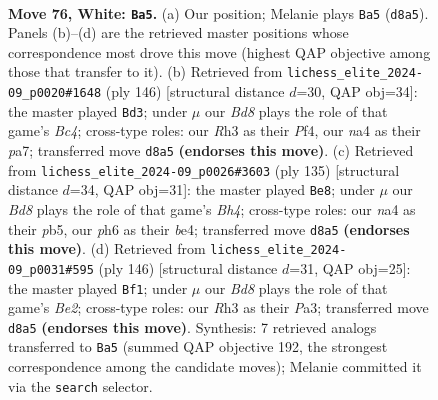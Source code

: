 \documentclass[11pt]{article}
\begin{document}
\begin{figure}[p]\centering
\begin{subfigure}{0.46\textwidth}\centering
\resizebox{\linewidth}{!}{%
\newchessgame
\chessboard[
  setfen={3B4/1r6/3p2kp/4p1b1/n3P2p/3K1P1R/8/8 w - - 0 76},
  showmover=false,
  pgfstyle=straightmove, color=movearrow, markmove={d8-a5}
]}
\caption{}
\end{subfigure}\hfill
\begin{subfigure}{0.46\textwidth}\centering
\resizebox{\linewidth}{!}{%
\newchessgame
\chessboard[
  setfen={8/p4p2/1p2bk1p/8/1PB2P2/P3K3/7P/8 w - - 29 74},
  showmover=false,
  pgfstyle=straightmove, color=movearrow, markmove={c4-d3}
]}
\caption{}
\end{subfigure}
\\[4pt]
\begin{subfigure}{0.46\textwidth}\centering
\resizebox{\linewidth}{!}{%
\newchessgame
\chessboard[
  setfen={7r/2R4P/7k/1P2P1pb/4B3/p4PK1/P7/8 b - - 0 68},
  showmover=false,
  pgfstyle=straightmove, color=movearrow, markmove={h5-e8}
]}
\caption{}
\end{subfigure}\hfill
\begin{subfigure}{0.46\textwidth}\centering
\resizebox{\linewidth}{!}{%
\newchessgame
\chessboard[
  setfen={8/8/8/p1p5/3p1kp1/P2P1b2/3KB2P/8 w - - 40 74},
  showmover=false,
  pgfstyle=straightmove, color=movearrow, markmove={e2-f1}
]}
\caption{}
\end{subfigure}
\caption{\textbf{Move 76, White: \texttt{Ba5}.} (a) Our position; Melanie plays \texttt{Ba5} (\texttt{d8a5}). Panels (b)--(d) are the retrieved master positions whose correspondence most drove this move (highest QAP objective among those that transfer to it). (b) Retrieved from \texttt{lichess\_elite\_2024-09\_p0020\#1648} (ply 146) [structural distance $d$=30, QAP obj=34]: the master played \texttt{Bd3}; under $\mu$ our \emph{Bd8} plays the role of that game's \emph{Bc4}; cross-type roles: our \emph{R}h3 as their \emph{P}f4, our \emph{n}a4 as their \emph{p}a7; transferred move \texttt{d8a5} \textbf{(endorses this move)}. (c) Retrieved from \texttt{lichess\_elite\_2024-09\_p0026\#3603} (ply 135) [structural distance $d$=34, QAP obj=31]: the master played \texttt{Be8}; under $\mu$ our \emph{Bd8} plays the role of that game's \emph{Bh4}; cross-type roles: our \emph{n}a4 as their \emph{p}b5, our \emph{p}h6 as their \emph{b}e4; transferred move \texttt{d8a5} \textbf{(endorses this move)}. (d) Retrieved from \texttt{lichess\_elite\_2024-09\_p0031\#595} (ply 146) [structural distance $d$=31, QAP obj=25]: the master played \texttt{Bf1}; under $\mu$ our \emph{Bd8} plays the role of that game's \emph{Be2}; cross-type roles: our \emph{R}h3 as their \emph{P}a3; transferred move \texttt{d8a5} \textbf{(endorses this move)}. Synthesis: 7 retrieved analogs transferred to \texttt{Ba5} (summed QAP objective 192, the strongest correspondence among the candidate moves); Melanie committed it via the \texttt{search} selector.}
\label{fig:thought-m150}
\end{figure}
\end{document}
